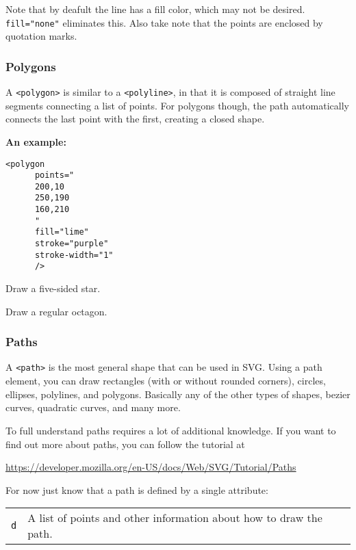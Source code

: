 \documentclass[english,11pt,a4paper]{report}
\begin{document}
Note that by deafult the line has a fill color, which may not be desired. \verb|fill="none"| eliminates this. Also take note that the points are enclosed by quotation marks.

\newpage
\subsubsection{Polygons}
A \verb|<polygon>| is similar to a \verb|<polyline>|, in that it is composed of straight line segments connecting a list of points. For polygons though, the path automatically connects the last point with the first, creating a closed shape.

{\bf An example:}
\begin{multicols}{2}
\begin{lstlisting}
<polygon 
      points="
      200,10 
      250,190 
      160,210
      " 
      fill="lime"
      stroke="purple"
      stroke-width="1" 
      />
\end{lstlisting}
\columnbreak

\end{multicols}

\begin{ex}
Draw a five-sided star.
\end{ex}

\begin{ex}
Draw a regular octagon.
\end{ex}

\newpage



\subsubsection{Paths}
A \verb|<path>| is the most general shape that can be used in SVG. Using a path element, you can draw rectangles (with or without rounded corners), circles, ellipses, polylines, and polygons. Basically any of the other types of shapes, bezier curves, quadratic curves, and many more.

To full understand paths requires a lot of additional knowledge. If you want to find out more about paths, you can follow the tutorial at

\url{https://developer.mozilla.org/en-US/docs/Web/SVG/Tutorial/Paths}

For now just know that a path is defined by a single attribute:
\begin{center}
\begin{tabular}{l|p{15cm}}
\verb|d| & A list of points and other information about how to draw the path.
\end{tabular}
\end{center}
\end{document}
